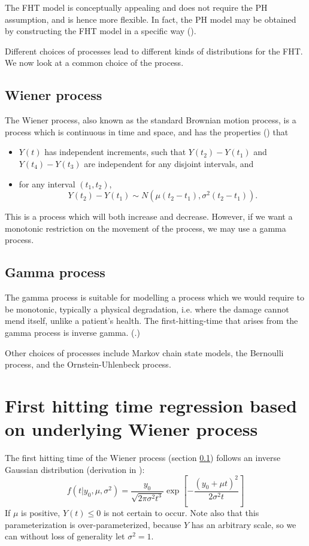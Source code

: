 The FHT model is conceptually appealing and does not require the PH assumption, and is hence more flexible. In fact, the PH model may be obtained by constructing the FHT model in a specific way (\cite{lee2010}).

Different choices of processes lead to different kinds of distributions for the FHT. We now look at a common choice of the process.

\subsection{Wiener process}\label{sec:wiener}
The Wiener process, also known as the standard Brownian motion process, is a process which is continuous in time and space, and has the properties (\cite[61]{caroni2017}) that
\begin{itemize}
    \item $Y(t)$ has independent increments, such that $Y(t_2)-Y(t_1)$ and $Y(t_4)-Y(t_3)$ are independent for any disjoint intervals, and
    \item for any interval $(t_1, t_2)$,
    \[
        Y(t_2)-Y(t_1)\sim N(\mu(t_2-t_1), \sigma^2(t_2-t_1)).
    \]
\end{itemize}
This is a process which will both increase and decrease. However, if we want a monotonic restriction on the movement of the process, we may use a gamma process.

\subsection{Gamma process}
The gamma process is suitable for modelling a process which we would require to be monotonic, typically a physical degradation, i.e. where the damage cannot mend itself, unlike a patient's health. The first-hitting-time that arises from the gamma process is inverse gamma. (\cite[503]{lee2006}.)

Other choices of processes include Markov chain state models, the Bernoulli process, and the Ornstein-Uhlenbeck process.

\section{First hitting time regression based on underlying Wiener process}
The first hitting time of the Wiener process (section \ref{sec:wiener}) follows an inverse Gaussian distribution (derivation in \cite[23-29]{chhikara1988}):
\begin{equation}
\label{eq:fht-ig}
    f(t|y_0,\mu,\sigma^2)=\frac{y_0}{\sqrt{2\pi\sigma^2t^3}}\exp\left[-\frac{(y_0+\mu t)^2}{2\sigma^2t}\right]
\end{equation}
If $\mu$ is positive, $Y(t)\leq 0$ is not certain to occur. Note also that this parameterization is over-parameterized, because $Y$ has an arbitrary scale, so we can without loss of generality let $\sigma^2=1$.

